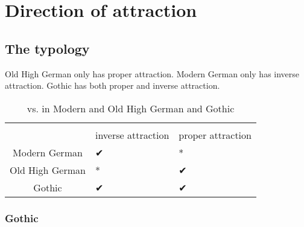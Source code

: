 
\chapter{Direction of attraction}


  \section{The typology}
Old High German only has proper attraction. Modern German only has inverse attraction. Gothic has both proper and inverse attraction.


\begin{table}[h]\label{tbl:intextgoth}
	\center
	\caption { vs.  in Modern and Old High German and Gothic}
	\begin{minipage}{0.6\linewidth}
		\begin{tabularx}{\textwidth}{c *{2}{Y}}
		\toprule
		 								& 				& 				\\
										& inverse attraction	& proper attraction		\\
		\midrule
		Modern German 	& ✔			 							&	*										\\
		Old High German	& *										&	✔										\\
		Gothic					&	✔										&	✔										\\
		\bottomrule
		\end{tabularx}
	\end{minipage}
\end{table}


\subsection{Gothic}

